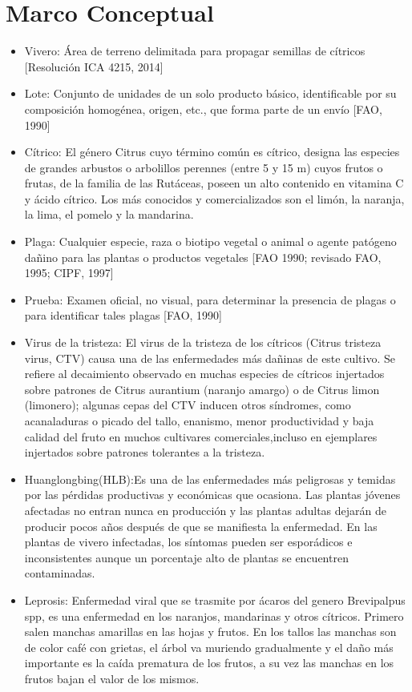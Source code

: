 \section{Marco Conceptual}
\begin{itemize}
\item Vivero: \'{A}rea de terreno delimitada para propagar semillas de c\'{i}tricos [Resoluci\'{o}n ICA 4215, 2014]
\item Lote: Conjunto de unidades de un solo producto b\'{a}sico, identificable por su composici\'{o}n homog\'{e}nea, origen, etc., que forma parte de un env\'{i}o [FAO, 1990] 
\item C\'{i}trico: El g\'{e}nero Citrus cuyo t\'{e}rmino com\'{u}n es c\'{i}trico, designa las especies de grandes arbustos o arbolillos perennes (entre 5 y 15 m) cuyos frutos o frutas, de la familia de las Rut\'{a}ceas, poseen un alto contenido en vitamina C y \'{a}cido c\'{i}trico. Los m\'{a}s conocidos y comercializados son el lim\'{o}n, la naranja, la lima, el pomelo y la mandarina.
\item Plaga: Cualquier especie, raza o biotipo vegetal o animal o agente pat\'{o}geno da\~{n}ino para las plantas o productos vegetales [FAO 1990; revisado FAO, 1995; CIPF, 1997] 
\item Prueba: Examen oficial, no visual, para determinar la presencia de plagas o para identificar tales plagas [FAO, 1990] 
\item Virus de la tristeza: El virus de la tristeza de los c\'{i}tricos (Citrus tristeza virus, CTV) causa una de las enfermedades m\'{a}s
da\~{n}inas de este cultivo. Se refiere al decaimiento observado en muchas especies de c\'{i}tricos injertados sobre patrones de Citrus aurantium (naranjo amargo) o de Citrus limon (limonero); algunas cepas del CTV inducen otros s\'{i}ndromes, como acanaladuras o picado del tallo, enanismo, menor productividad y baja calidad del fruto en muchos cultivares comerciales,incluso en ejemplares injertados sobre patrones tolerantes a la tristeza.\cite{CTV}
\item Huanglongbing(HLB):Es una de las enfermedades m\'{a}s peligrosas y temidas por las p\'{e}rdidas productivas y econ\'{o}micas que ocasiona. Las plantas j\'{o}venes afectadas no entran nunca en producci\'{o}n y las plantas adultas dejar\'{a}n de producir pocos a\~{n}os despu\'{e}s de que se manifiesta la enfermedad. En las plantas de vivero infectadas, los s\'{i}ntomas pueden ser espor\'{a}dicos e inconsistentes aunque un porcentaje alto de plantas se encuentren contaminadas.\cite{HLB}
\item Leprosis: Enfermedad viral que se trasmite por \'{a}caros del genero Brevipalpus spp, es una enfermedad en los naranjos, mandarinas y otros c\'{i}tricos. Primero salen manchas amarillas en las hojas y frutos. En los tallos las manchas son de color caf\'{e} con grietas, el \'{a}rbol va muriendo gradualmente y el da\~{n}o m\'{a}s importante es la ca\'{i}da prematura de los frutos, a su vez las manchas en los frutos bajan el valor de los mismos.\cite{LEP}

\end{itemize}
